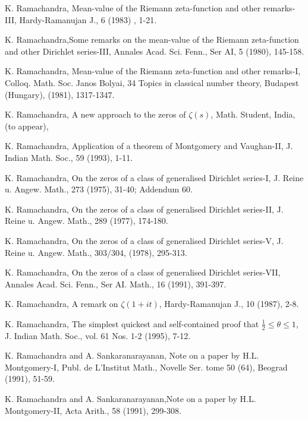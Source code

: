 \begin{thebibliography}{99}
 K. Ramachandra, Mean-value of the Riemann zeta-function and other remarks-III, Hardy-Ramanujan J., 6 (1983) , 1-21.

 K. Ramachandra,\pageoriginale Some remarks on the mean-value of the Riemann zeta-function and other Dirichlet series-III, Annales Acad. Sci. Fenn., Ser AI, 5 (1980), 145-158.

 K. Ramachandra, Mean-value of the Riemann zeta-function and other remarks-I, Colloq. Math. Soc. Janos Bolyai, 34 Topics in classical number theory, Budapest (Hungary), (1981), 1317-1347.

 K. Ramachandra, A new approach to the zeros of $\zeta(s)$, Math. Student, India, (to appear),

 K. Ramachandra, Application of a theorem of Montgomery and Vaughan-II, J. Indian Math. Soc., 59 (1993), 1-11.

 K. Ramachandra, On the zeros of a class of generalised Dirichlet series-I, J. Reine u. Angew. Math., 273 (1975), 31-40; Addendum 60.

 K. Ramachandra, On the zeros of a class of generalised Dirichlet series-II, J. Reine u. Angew. Math., 289 (1977), 174-180.

 K. Ramachandra, On the zeros of a class of generalised Dirichlet series-V, J. Reine u. Angew. Math., 303/304, (1978), 295-313.

 K. Ramachandra, On the zeros of a class of generalised Dirichlet series-VII, Annales Acad. Sci. Fenn., Ser AI. Math., 16 (1991), 391-397.

 K. Ramachandra, A remark on $\zeta(1+ it)$, Hardy-Ramanujan J., 10 (1987), 2-8.

 K. Ramachandra, The simplest quickest and self-contained proof that $\frac{1}{2} \leq \theta \leq 1$, J. Indian Math. Soc., vol. 61 Nos. 1-2 (1995), 7-12. 

 K. Ramachandra and A. Sankaranarayanan, Note on a paper by H.L. Montgomery-I, Publ. de L'Institut Math., Novelle Ser. tome 50 (64), Beograd (1991), 51-59.

 K. Ramachandra and A. Sankaranarayanan,\pageoriginale Note on a paper by H.L. Montgomery-II, Acta Arith., 58 (1991), 299-308.


\end{thebibliography}
